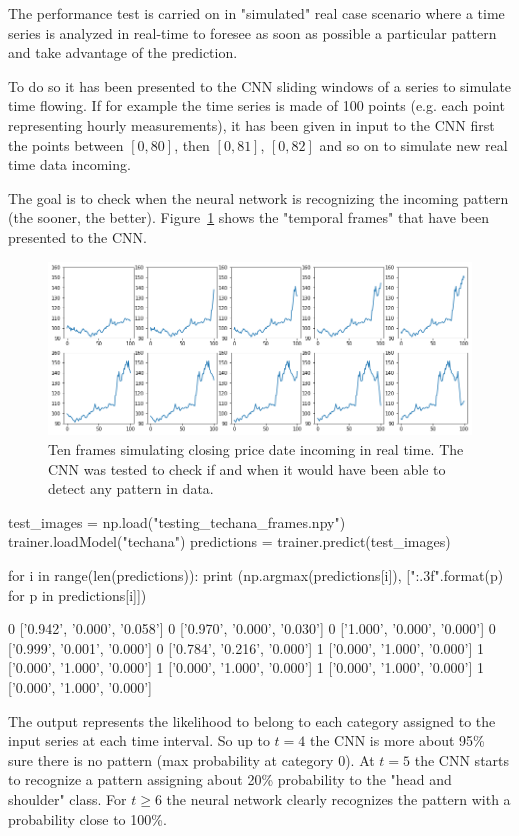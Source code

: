 The performance test is carried on in "simulated" real case scenario where a time series is analyzed in real-time to foresee as soon as possible a particular pattern and take advantage of the prediction.

To do so it has been presented to the CNN sliding windows of a series to simulate time flowing. If for example the time series is made of 100 points (e.g. each point representing hourly measurements), it has been given in input to the CNN first the points between \([0, 80]\), then \([0, 81]\), \([0, 82]\) and so on to simulate new real time data incoming. 

The goal is to check when the neural network is recognizing the incoming pattern (the sooner, the better). Figure~\ref{fig:frame_simulation} shows the "temporal frames" that have been presented to the CNN.

\begin{figure}
\centering
\includegraphics[width=\textwidth]{figures/tech_ana_frames}
\caption{Ten frames simulating closing price date incoming in real time. The CNN was tested to check if and when it would have been able to detect any pattern in data.}
\label{fig:frame_simulation}
\end{figure}

\begin{ipython}
test_images = np.load("testing_techana_frames.npy")
trainer.loadModel("techana")
predictions = trainer.predict(test_images)

for i in range(len(predictions)):
    print (np.argmax(predictions[i]), ["{:.3f}".format(p) for p in predictions[i]])
\end{ipython}
\begin{ioutput}
0 ['0.942', '0.000', '0.058']
0 ['0.970', '0.000', '0.030']
0 ['1.000', '0.000', '0.000']
0 ['0.999', '0.001', '0.000']
0 ['0.784', '0.216', '0.000']
1 ['0.000', '1.000', '0.000']
1 ['0.000', '1.000', '0.000']
1 ['0.000', '1.000', '0.000']
1 ['0.000', '1.000', '0.000']
1 ['0.000', '1.000', '0.000']
\end{ioutput}
\noindent
The output represents the likelihood to belong to each category assigned to the input series at each time interval. So up to $t=4$ the CNN is more about 95\% sure there is no pattern (max probability at category 0). 
At $t=5$ the CNN starts to recognize a pattern assigning about 20\% probability to the "head and shoulder" class. For $t\geq 6$ the neural network clearly recognizes the pattern with a probability close to 100\%.
	
